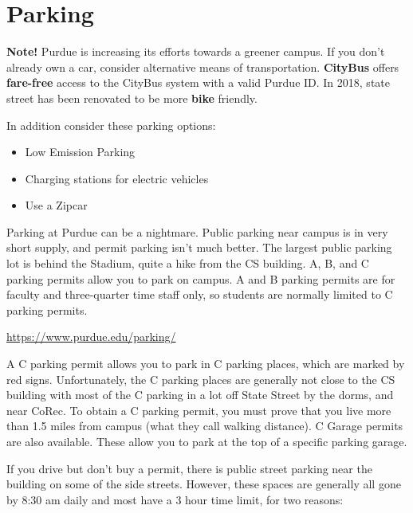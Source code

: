 \section{Parking}

\begin{tcolorbox}[colback=green!5!white,colframe=green!75!black]
	\textbf{Note!} Purdue is increasing its efforts towards a greener campus. If you don't already own a car, consider alternative means of transportation. \textbf{CityBus} offers \textbf{fare-free} access to the CityBus system with a valid Purdue ID. In 2018, state street has been renovated to be more \textbf{bike} friendly.

	\vspace{\baselineskip}
	In addition consider these parking options:
	\begin{itemize}
		\item Low Emission Parking
		\item Charging stations for electric vehicles
		\item Use a Zipcar
	\end{itemize}
\end{tcolorbox}

Parking at Purdue can be a nightmare. Public parking near campus is in very short supply, and permit parking isn't much better. The largest public parking lot is behind the Stadium, quite a hike from the CS building. A, B, and C parking permits allow you to park on campus. A and B parking permits are for faculty and three-quarter time staff only, so students are normally limited to C parking permits.

\centerline{\url{https://www.purdue.edu/parking/}}
\vspace{\baselineskip}

A C parking permit allows you to park in C parking places, which are marked by red signs. Unfortunately, the C parking places are generally not close to the CS building with most of the C parking in a lot off State Street by the dorms, and near CoRec. To obtain a C parking permit, you must prove that you live more than 1.5 miles from campus (what they call walking distance). C Garage permits are also available. These allow you to park at the top of a specific parking garage.

If you drive but don't buy a permit, there is public street parking near the building on some of the side streets. However, these spaces are generally all gone by 8:30 am daily and most have a 3 hour time limit, for two reasons:

